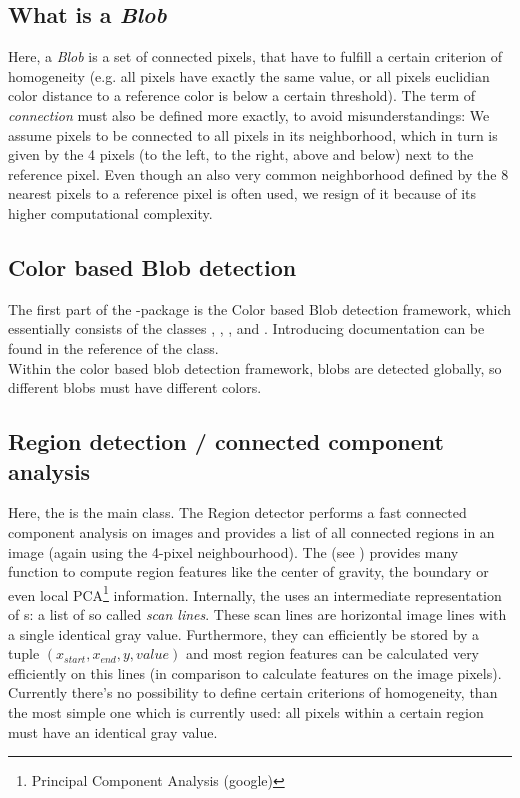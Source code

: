 \subsection{What is a \emph{Blob}}
Here, a \emph{Blob} is a set of connected pixels, that have to fulfill a certain criterion of homogeneity (e.g. all pixels have exactly the same value, or all pixels euclidian color distance to a reference color is below a certain threshold). The term of \emph{connection} must also be defined more exactly, to avoid misunderstandings: We assume pixels to be connected to all pixels in its neighborhood, which in turn is given by the 4 pixels (to the left, to the right, above and below) next to the reference pixel. 
Even though an also very common neighborhood defined by the 8 nearest pixels to a reference pixel is often used, we resign of it because of its higher computational complexity. 

\subsection{Color based Blob detection}
The first part of the -package is the Color based Blob detection framework, which essentially consists of the classes , , ,  and . Introducing documentation can be found in the reference of the  class.\\
Within the color based blob detection framework, blobs are detected globally, so different blobs must have different colors.

\subsection{Region detection / connected component analysis}
Here, the  is the main class. The Region detector performs a fast connected component analysis on images and provides a list of all connected regions in an image (again using the 4-pixel neighbourhood). The  (see ) provides many function to compute region features like the center of gravity, the boundary or even local PCA\footnote{Principal Component Analysis (google)} information. Internally, the  uses an intermediate representation of s: a list of so called \emph{scan lines}. These scan lines are horizontal image lines with a single identical gray value. Furthermore, they can efficiently be stored by a tuple $(x_{start},x_{end},y,value)$ and most region features can be calculated very efficiently on this lines (in comparison to calculate features on the image pixels). Currently there's no possibility to define certain criterions of homogeneity, than the most simple one which is currently used: all pixels within a certain region must have an identical gray value. 

